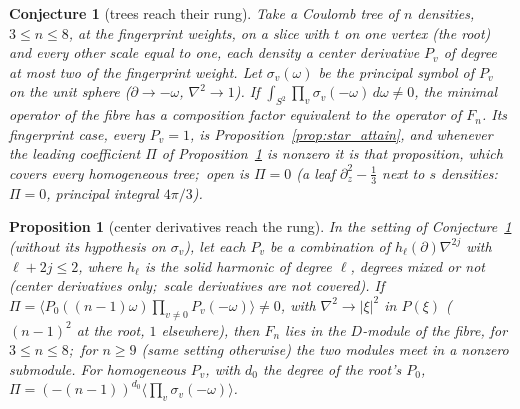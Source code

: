 \documentclass[aps,pra,twocolumn,superscriptaddress,longbibliography]{revtex4-2}
\newtheorem{proposition}{Proposition}
\newtheorem{conjecture}{Conjecture}
\begin{document}
\begin{conjecture}[trees reach their rung]
\label{conj:tree_attain}
Take a Coulomb tree of $n$ densities, $3\le n\le8$, at the fingerprint
weights, on a slice with $t$ on one vertex (the root) and every other scale
equal to one, each density a center derivative $P_v$ of degree at most two of
the fingerprint weight.  Let $\sigma_v(\omega)$ be the principal symbol of
$P_v$ on the unit sphere ($\partial\to-\omega$, $\nabla^2\to1$).  If
$\int_{S^2}\prod_v\sigma_v(-\omega)\,d\omega\neq0$, the minimal operator of the
fibre has a composition factor equivalent to the operator of $F_n$.  Its
fingerprint case, every $P_v=1$, is Proposition~\ref{prop:star_attain},
and whenever the leading coefficient $\Pi$ of Proposition~\ref{prop:tree_attain_hom} is nonzero it is that proposition, which covers every
homogeneous tree;\ open is $\Pi=0$ (a leaf $\partial_z^2-\tfrac13$ next to $s$ densities:\
$\Pi=0$, principal integral $4\pi/3$).
\end{conjecture}

\begin{proposition}[center derivatives reach the rung]
\label{prop:tree_attain_hom}
In the setting of Conjecture~\ref{conj:tree_attain} (without its hypothesis on
$\sigma_v$), let each $P_v$ be a combination of $h_\ell(\partial)\nabla^{2j}$ with
$\ell+2j\le2$, where $h_\ell$ is the solid harmonic of degree $\ell$, degrees mixed or not
(center derivatives only;\ scale derivatives are not covered).  If
$\Pi=\langle P_0((n-1)\omega)\prod_{v\neq0}P_v(-\omega)\rangle\neq0$, with $\nabla^2\to|\xi|^2$
in $P(\xi)$ ($(n-1)^2$ at the root, $1$ elsewhere), then $F_n$ lies in the $D$-module of the
fibre, for $3\le n\le8$;\ for $n\ge9$ (same setting otherwise) the two modules meet in a
nonzero submodule.  For homogeneous $P_v$, with $d_0$ the degree of the root's $P_0$,
$\Pi=(-(n-1))^{d_0}\langle\prod_v\sigma_v(-\omega)\rangle$.
\end{proposition}
\end{document}
